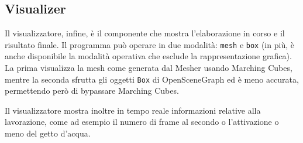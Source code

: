 \subsection{Visualizer}

Il visualizzatore, infine, è il componente che mostra l'elaborazione in corso e il risultato finale. Il programma può operare in due modalità: \verb!mesh! e \verb!box! (in più, è anche disponibile la modalità operativa che esclude la rappresentazione grafica). La prima visualizza la mesh come generata dal Mesher usando Marching Cubes, mentre la seconda sfrutta gli oggetti \verb!Box! di OpenSceneGraph ed è meno accurata, permettendo però di bypassare Marching Cubes.

Il visualizzatore mostra inoltre in tempo reale informazioni relative alla lavorazione, come ad esempio il numero di frame al secondo o l'attivazione o meno del getto d'acqua.


